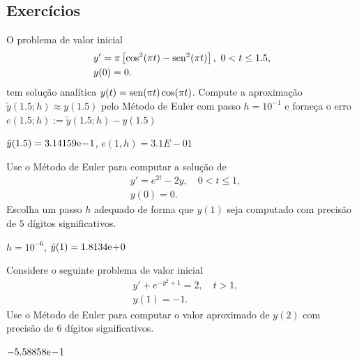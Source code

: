 \subsection{Exercícios}

\begin{exer}
  O problema de valor inicial
  \begin{subequations}
    \begin{align}
      &y' = \pi\left[\cos^2(\pi t) - \operatorname{sen}^2(\pi t)\right], ~0 < t \leq 1.5,\\
      &y(0) = 0.
    \end{align}
  \end{subequations}
  tem solução analítica $y(t) = \operatorname{sen}(\pi t)\cos(\pi t)$. Compute a aproximação $\tilde{y}(1.5; h) \approx y(1.5)$ pelo Método de Euler com passo $h=10^{-1}$ e forneça o erro $e(1.5; h) := \tilde{y}(1.5; h) - y(1.5)$
\end{exer}
\begin{resp}
  $\tilde{y}(1.5) = 3.14159\mathrm{e}\!-\!1$, $e(1, h) = 3.1E-01$
\end{resp}

\begin{exer}
  Use o Método de Euler para computar a solução de
  \begin{subequations}
    \begin{align}
      &y' = e^{2t} - 2y,\quad 0 < t\leq 1,\\
      &y(0) = 0.
    \end{align}
  \end{subequations}
  Escolha um passo $h$ adequado de forma que $y(1)$ seja computado com precisão de $5$ dígitos significativos.
\end{exer}
\begin{resp}
  $h=10^{-6}$, $\tilde{y}(1) = 1.8134\mathrm{e}\!+\!0$
\end{resp}

\begin{exer}
  Considere o seguinte problema de valor inicial
  \begin{subequations}
    \begin{align}
      &y' + e^{-y^2+1} = 2,\quad t>1,\\
      &y(1) = -1.
    \end{align}
\end{subequations}
Use o Método de Euler para computar o valor aproximado de $y(2)$ com precisão de $6$ dígitos significativos.
\end{exer}
\begin{resp}
  $-5.58858\mathrm{e}\!-\!1$
\end{resp}

